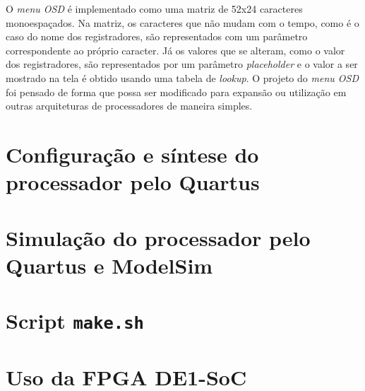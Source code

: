     { O \textit{menu OSD} é implementado como uma matriz de 52x24 caracteres
        monoespaçados. Na matriz, os caracteres que não mudam com o tempo, como
        é o caso do nome dos registradores, são representados com um parâmetro
        correspondente ao próprio caracter. Já os valores que se alteram, como
        o valor dos registradores, são representados por um parâmetro
        \textit{placeholder} e o valor a ser mostrado na tela é obtido usando
        uma tabela de \textit{lookup}. O projeto do \textit{menu OSD} foi pensado
        de forma que possa ser modificado para expansão ou utilização em outras
        arquiteturas de processadores de maneira simples.
    }


    \section{Configuração e síntese do processador pelo Quartus}


    \section{Simulação do processador pelo Quartus e ModelSim}

    \section{Script \texttt{make.sh}}

    \section{Uso da FPGA DE1-SoC}


